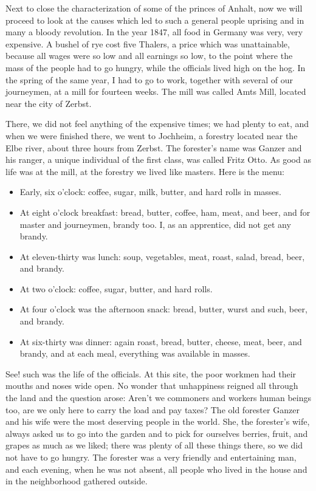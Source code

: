 Next to close the characterization of some of the princes of Anhalt, now we will proceed to look at the causes which led to such a general people uprising and in many a bloody revolution. In the year 1847, all food in Germany was very, very expensive. A bushel of rye cost five Thalers, a price which was unattainable, because all wages were so low and all earnings so low, to the point where the mass of the people had to go hungry, while the officials lived high on the hog. In the spring of the same year, I had to go to work, together with several of our journeymen, at a mill for fourteen weeks. The mill was called Amts Mill, located near the city of Zerbst.

There, we did not feel anything of the expensive times; we had plenty to eat, and when we were finished there, we went to Jochheim, a forestry located near the Elbe river, about three hours from Zerbst. The forester's name was Ganzer and his ranger, a unique individual of the first class, was called Fritz Otto. As good as life was at the mill, at the forestry we lived like masters. Here is the menu:

\begin{itemize}
\tightlist
\item
  Early, six o'clock: coffee, sugar, milk, butter, and hard rolls in masses.
\item
  At eight o'clock breakfast: bread, butter, coffee, ham, meat, and beer, and for master and journeymen, brandy too. I, as an apprentice, did not get any brandy.
\item
  At eleven-thirty was lunch: soup, vegetables, meat, roast, salad, bread, beer, and brandy.
\item
  At two o'clock: coffee, sugar, butter, and hard rolls.
\item
  At four o'clock was the afternoon snack: bread, butter, wurst and such, beer, and brandy.
\item
  At six-thirty was dinner: again roast, bread, butter, cheese, meat, beer, and brandy, and at each meal, everything was available in masses.
\end{itemize}

See! such was the life of the officials. At this site, the poor workmen had their mouths and noses wide open. No wonder that unhappiness reigned all through the land and the question arose: Aren't we commoners and workers human beings too, are we only here to carry the load and pay taxes? The old forester Ganzer and his wife were the most deserving people in the world. She, the forester's wife, always asked us to go into the garden and to pick for ourselves berries, fruit, and grapes as much as we liked; there was plenty of all these things there, so we did not have to go hungry. The forester was a very friendly and entertaining man, and each evening, when he was not absent, all people who lived in the house and in the neighborhood gathered outside.

